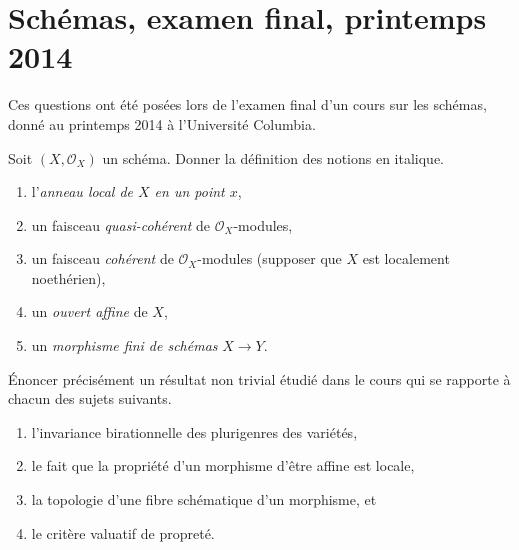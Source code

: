 \section{Schémas, examen final, printemps 2014}
\label{section-final-exam-spring-2014}

\noindent
Ces questions ont été posées lors de l'examen final d'un cours sur les
schémas, donné au printemps 2014 à l'Université Columbia.

\begin{exercise}[Définitions]
\label{exercise-definitions-spring-2014}
Soit $(X, \mathcal{O}_X)$ un schéma. Donner la définition des
notions en italique.
\begin{enumerate}
\item l'{\it anneau local de $X$ en un point $x$},
\item un faisceau {\it quasi-cohérent} de $\mathcal{O}_X$-modules,
\item un faisceau {\it cohérent} de $\mathcal{O}_X$-modules (supposer
que $X$ est localement noethérien),
\item un {\it ouvert affine} de $X$,
\item un {\it morphisme fini de schémas} $X \to Y$.
\end{enumerate}
\end{exercise}

\begin{exercise}[Théorèmes]
\label{exercise-results-spring-2014}
Énoncer précisément un résultat non trivial étudié dans le cours qui se rapporte
à chacun des sujets suivants.
\begin{enumerate}
\item l'invariance birationnelle des plurigenres des variétés,
\item le fait que la propriété d'un morphisme d'être affine est locale,
\item la topologie d'une fibre schématique d'un morphisme, et
\item le critère valuatif de propreté.
\end{enumerate}
\end{exercise}


